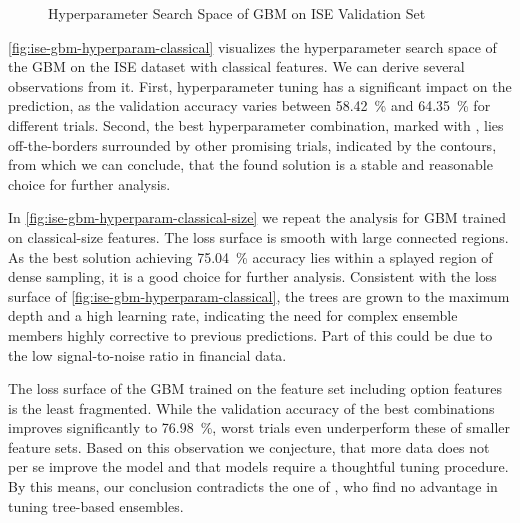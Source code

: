 \begin{figure}[!b]
    \vfill
\end{figure}

\clearpage

\begin{figure}[ht]
    \addtocounter{figure}{-1}
    \caption[]{Hyperparameter Search Space of \gls{GBM} on \gls{ISE} Validation Set}
    \label{fig:ise-gbm-hyperparam}
\end{figure}
\cref{fig:ise-gbm-hyperparam-classical} visualizes the hyperparameter search space of the \gls{GBM} on the \gls{ISE} dataset with classical features. We can derive several observations from it. First, hyperparameter tuning has a significant impact on the prediction, as the validation accuracy varies between \SI{58.42}{\percent} and \SI{64.35}{\percent} for different trials. Second, the best hyperparameter combination, marked with \bestcircle, lies off-the-borders surrounded by other promising trials, indicated by the contours, from which we can conclude, that the found solution is a stable and reasonable choice for further analysis.

In \cref{fig:ise-gbm-hyperparam-classical-size} we repeat the analysis for \gls{GBM} trained on classical-size features. The loss surface is smooth with large connected regions. As the best solution achieving \SI{75.04}{\percent} accuracy lies within a splayed region of dense sampling, it is a good choice for further analysis. Consistent with the loss surface of \cref{fig:ise-gbm-hyperparam-classical}, the trees are grown to the maximum depth and a high learning rate, indicating the need for complex ensemble members highly corrective to previous predictions. Part of this could be due to the low signal-to-noise ratio in financial data.

The loss surface of the \gls{GBM} trained on the feature set including option features is the least fragmented. While the validation accuracy of the best combinations improves significantly to \SI{76.98}{\percent}, worst trials even underperform these of smaller feature sets. Based on this observation we conjecture, that more data does not per se improve the model and that models require a thoughtful tuning procedure. By this means, our conclusion contradicts the one of \textcite[][14]{ronenMachineLearningTrade2022}, who find no advantage in tuning tree-based ensembles.

